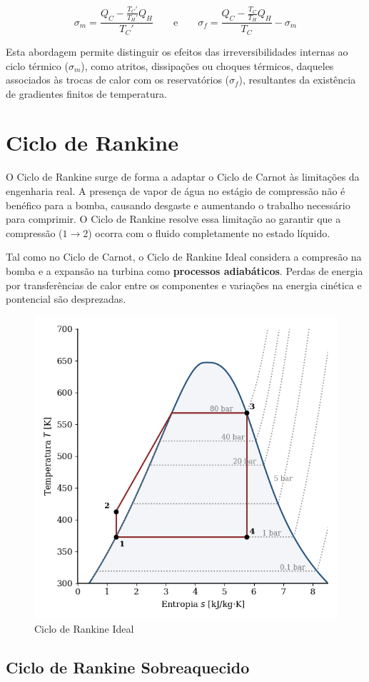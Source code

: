 \begin{equation}
    \sigma_m = \frac{Q_C - \frac{T_C'}{T_H'} Q_H}{T_C'} \qquad \text{e} \qquad \sigma_f = \frac{Q_C - \frac{T_C}{T_H} Q_H}{T_C} - \sigma_m
\end{equation}

Esta abordagem permite distinguir os efeitos das irreversibilidades internas ao ciclo térmico (\( \sigma_m \)), como atritos, dissipações ou choques térmicos, daqueles associados às trocas de calor com os reservatórios (\( \sigma_f \)), resultantes da existência de gradientes finitos de temperatura.



\section{Ciclo de Rankine}

O Ciclo de Rankine surge de forma a adaptar o Ciclo de Carnot às limitações da engenharia real. A presença de vapor de água no estágio de compressão não é benéfico para a bomba, causando desgaste e aumentando o trabalho necessário para comprimir. O Ciclo de Rankine resolve essa limitação ao garantir que a compressão ($1 \rightarrow 2$) ocorra com o fluido completamente no estado líquido.

Tal como no Ciclo de Carnot, o Ciclo de Rankine Ideal considera a compresão na bomba e a expansão na turbina como \textbf{processos adiabáticos}. Perdas de energia por transferências de calor entre os componentes e variações na energia cinética e pontencial são desprezadas.

\begin{figure}[H]
    \centering
    \includegraphics[width=0.45\linewidth]{graphs/rankine-Ts-ideal-ideal.png}
    \caption{Ciclo de Rankine Ideal}
    \label{fig:rankine-Ts-ideal-ideal}
\end{figure}

\subsection{Ciclo de Rankine Sobreaquecido}

